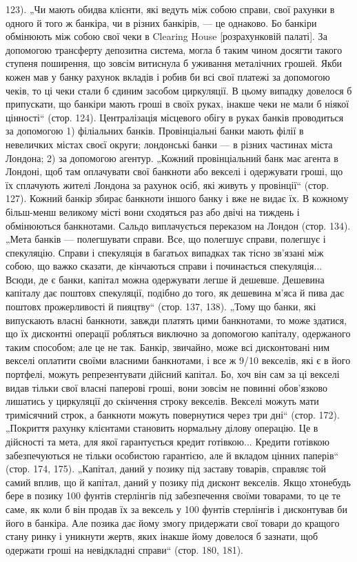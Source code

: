 123). „Чи мають обидва клієнти, які ведуть між собою
справи, свої рахунки в одного й того ж банкіра, чи в різних банкірів, — це
однаково. Бо банкіри обмінюють між собою свої чеки в Clearing House [розрахунковій палаті]. За
допомогою трансферту депозитна система, могла б
таким чином досягти такого ступеня поширення, що зовсім витиснула б
уживання металічних грошей. Якби кожен мав у банку рахунок вкладів і робив би всі свої платежі за
допомогою чеків, то ці чеки стали б єдиним засобом циркуляції. В цьому випадку довелося б
припускати, що банкіри мають
гроші в своїх руках, інакше чеки не мали б ніякої цінності“ (стор. 124). Централізація місцевого
обігу в руках банків проводиться за допомогою 1) філіальних банків. Провінціальні банки мають філії
в невеличких містах своєї округи;
лондонські банки — в різних частинах міста Лондона; 2) за допомогою агентур.
„Кожний провінціальний банк має агента в Лондоні, щоб там оплачувати свої
банкноти або векселі і одержувати гроші, що їх сплачують жителі Лондона за рахунок осіб, які живуть
у провінції“ (стор. 127). Кожний банкір збирає банкноти
іншого банку і вже не видає їх. В кожному більш-менш великому місті
вони сходяться раз або двічі на тиждень і обмінюються банкнотами. Сальдо
виплачується переказом на Лондон (стор. 134). „Мета банків — полегшувати
справи. Все, що полегшує справи, полегшує і спекуляцію. Справи і спекуляція
в багатьох випадках так тісно зв’язані між собою, що важко сказати, де кінчаються справи і
починається спекуляція... Всюди, де є банки, капітал можна
одержувати легше й дешевше. Дешевина капіталу дає поштовх спекуляції,
подібно до того, як дешевина м’яса й пива дає поштовх прожерливості й пияцтву“ (стор. 137, 138).
„Тому що банки, які випускають власні банкноти, завжди
платять цими банкнотами, то може здатися, що їх дисконтні операції робляться
виключно за допомогою капіталу, одержаного таким способом; але це не так.
Банкір, звичайно, може всі дисконтовані ним векселі оплатити своїми власними
банкнотами, і все ж 9/10 векселів, які є в його портфелі, можуть репрезентувати дійсний капітал. Бо,
хоч він сам за ці векселі видав тільки свої власні паперові гроші, вони зовсім не повинні
обов’язково лишатись у циркуляції до
скінчення строку векселів. Векселі можуть мати тримісячний строк, а банкноти
можуть повернутися через три дні“ (стор. 172). „Покриття рахунку клієнтами
становить нормальну ділову операцію. Це в дійсності та мета, для якої
гарантується кредит готівкою... Кредити готівкою забезпечуються не тільки
особистою гарантією, але й вкладом цінних паперів“ (стор. 174, 175). „Капітал,
даний у позику під заставу товарів, справляє той самий вплив, що й капітал,
даний у позику під дисконт векселів. Якщо хтонебудь бере в позику 100 фунтів
стерлінгів під забезпечення своїми товарами, то це те саме, як коли б він продав
їх за вексель у 100 фунтів стерлінгів і дисконтував би його в банкіра.
Але позика дає йому змогу придержати свої товари до кращого стану ринку і
уникнути жертв, яких інакше йому довелося б зазнати, щоб одержати гроші
на невідкладні справи“ (стор. 180, 181).

